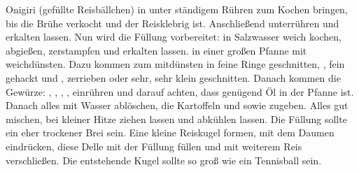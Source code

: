 \begin{recipe}{Onigiri (gefüllte Reisbällchen)}
	  in 
	 unter ständigem Rühren zum Kochen bringen, bis die Brühe verkocht und der Reisklebrig ist. Anschließend
	 unterrühren und erkalten lassen. Nun wird die Füllung vorbereitet:
	 in Salzwasser weich kochen, abgießen, zerstampfen und erkalten lassen. 
	 in einer großen Pfanne mit
	 weichdünsten. Dazu kommen zum mitdünsten 
	 in feine Ringe geschnitten,
	, fein gehackt und 
	, zerrieben oder sehr, sehr klein geschnitten. Danach kommen die Gewürze:
	,
	,
	,
	,
	 einrühren und darauf achten, dass genügend Öl in der Pfanne ist. Danach alles mit Wasser ablöschen, die Kartoffeln und 
	 sowie
	 zugeben. Alles gut mischen, bei kleiner Hitze ziehen lassen und abkühlen lassen. Die Füllung sollte ein eher trockener Brei sein. Eine kleine Reiskugel formen, mit dem Daumen eindrücken, diese Delle mit der Füllung füllen und mit weiterem Reis verschließen. Die entstehende Kugel sollte so groß wie ein Tennisball sein.
\end{recipe}